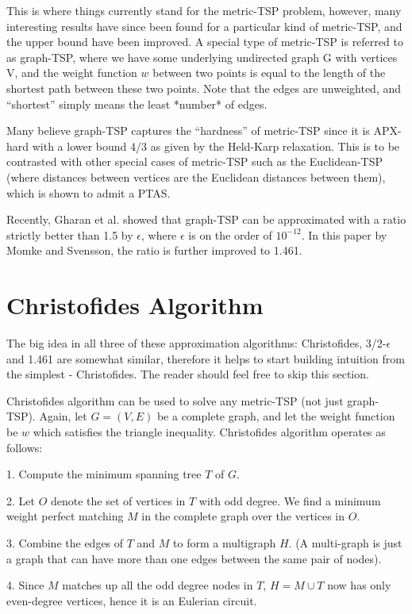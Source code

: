 \documentclass[12pt]{article}
\begin{document}
This is where things currently stand for the metric-TSP problem, however, many interesting results have since been found for a particular kind of metric-TSP, and the upper bound have been improved. A special type of metric-TSP is referred to as graph-TSP, where we have some underlying undirected graph G with vertices V, and the weight function $w$ between two points is equal to the length of the shortest path between these two points. Note that the edges are unweighted, and ``shortest'' simply means the least *number* of edges.

Many believe graph-TSP captures the ``hardness'' of metric-TSP since it is APX-hard with a lower bound 4/3 as given by the Held-Karp relaxation. This is to be contrasted with other special cases of metric-TSP such as the Euclidean-TSP (where distances between vertices are the Euclidean distances between them), which is shown to admit a PTAS.

Recently, Gharan et al. showed that graph-TSP can be approximated with a ratio strictly better than 1.5 by $\epsilon$, where $\epsilon$ is on the order of $10^{-12}$. In this paper by Momke and Svensson, the ratio is further improved to 1.461.

\section{Christofides Algorithm}

The big idea in all three of these approximation algorithms: Christofides, 3/2-$\epsilon$ and 1.461 are somewhat similar, therefore it helps to start building intuition from the simplest - Christofides. The reader should feel free to skip this section.

Christofides algorithm can be used to solve any metric-TSP (not just graph-TSP). Again, let $G=(V,E)$ be a complete graph, and let the weight function be $w$ which satisfies the triangle inequality. Christofides algorithm operates as follows:

1. Compute the minimum spanning tree $T$ of $G$.

2. Let $O$ denote the set of vertices in $T$ with odd degree. We find a minimum weight perfect matching $M$ in the complete graph over the vertices in $O$.

3. Combine the edges of $T$ and $M$ to form a multigraph $H$. (A multi-graph is just a graph that can have more than one edges between the same pair of nodes).

4. Since $M$ matches up all the odd degree nodes in $T$, $H=M\cup T$ now has only even-degree vertices, hence it is an Eulerian circuit.
\end{document}
